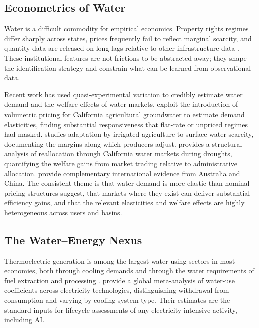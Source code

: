 \documentclass[11pt, letterpaper]{article}
\begin{document}
\subsection{Econometrics of Water}

Water is a difficult commodity for empirical economics. Property rights regimes differ sharply across states, prices frequently fail to reflect marginal scarcity, and quantity data are released on long lags relative to other infrastructure data \citep{hanemann2006economic,leflaive2024economics}. These institutional features are not frictions to be abstracted away; they shape the identification strategy and constrain what can be learned from observational data.

Recent work has used quasi-experimental variation to credibly estimate water demand and the welfare effects of water markets. \citet{bruno2021missing} exploit the introduction of volumetric pricing for California agricultural groundwater to estimate demand elasticities, finding substantial responsiveness that flat-rate or unpriced regimes had masked. \citet{hagerty2022adaptation} studies adaptation by irrigated agriculture to surface-water scarcity, documenting the margins along which producers adjust. \citet{rafey2023droughts} provides a structural analysis of reallocation through California water markets during droughts, quantifying the welfare gains from market trading relative to administrative allocation. \citet{zhao2024water,zhao2024impact,liu2025does} provide complementary international evidence from Australia and China. The consistent theme is that water demand is more elastic than nominal pricing structures suggest, that markets where they exist can deliver substantial efficiency gains, and that the relevant elasticities and welfare effects are highly heterogeneous across users and basins.

\subsection{The Water--Energy Nexus}

Thermoelectric generation is among the largest water-using sectors in most economies, both through cooling demands and through the water requirements of fuel extraction and processing \citep{jin2019water}. \citet{jin2019water} provide a global meta-analysis of water-use coefficients across electricity technologies, distinguishing withdrawal from consumption and varying by cooling-system type. Their estimates are the standard inputs for lifecycle assessments of any electricity-intensive activity, including AI.
\end{document}
